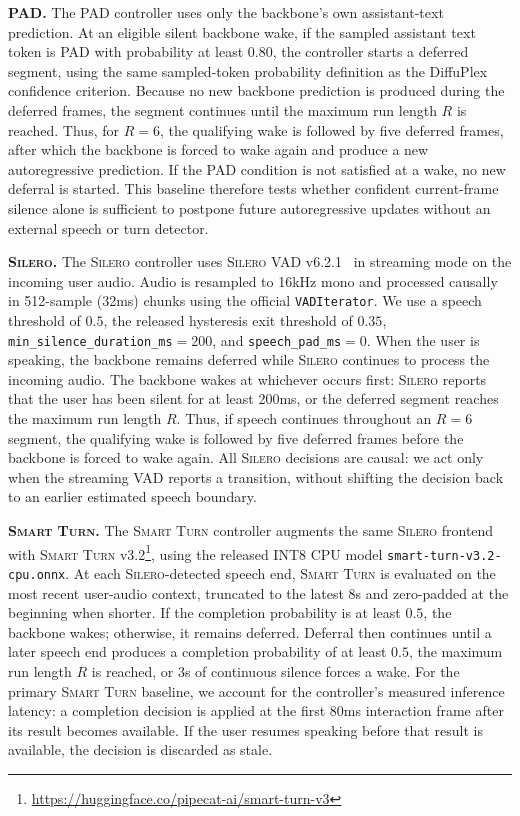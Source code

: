 \noindent\textbf{\textsc{PAD}.}
The \textsc{PAD} controller uses only the backbone's own assistant-text prediction.
At an eligible silent backbone wake, if the sampled assistant text token is PAD with probability at least $0.80$, the controller starts a deferred segment, using the same sampled-token probability definition as the DiffuPlex confidence criterion.
Because no new backbone prediction is produced during the deferred frames, the segment continues until the maximum run length $R$ is reached.
Thus, for $R=6$, the qualifying wake is followed by five deferred frames, after which the backbone is forced to wake again and produce a new autoregressive prediction.
If the PAD condition is not satisfied at a wake, no new deferral is started.
This baseline therefore tests whether confident current-frame silence alone is sufficient to postpone future autoregressive updates without an external speech or turn detector.

\noindent\textbf{\textsc{Silero}.}
The \textsc{Silero} controller uses \textsc{Silero VAD} v6.2.1~\citep{SileroVAD} in streaming mode on the incoming user audio.
Audio is resampled to 16kHz mono and processed causally in 512-sample (32ms) chunks using the official \texttt{VADIterator}.
We use a speech threshold of $0.5$, the released hysteresis exit threshold of $0.35$, \texttt{min\_silence\_duration\_ms}$=200$, and \texttt{speech\_pad\_ms}$=0$.
When the user is speaking, the backbone remains deferred while \textsc{Silero} continues to process the incoming audio.
The backbone wakes at whichever occurs first: \textsc{Silero} reports that the user has been silent for at least 200ms, or the deferred segment reaches the maximum run length $R$.
Thus, if speech continues throughout an $R=6$ segment, the qualifying wake is followed by five deferred frames before the backbone is forced to wake again.
All \textsc{Silero} decisions are causal: we act only when the streaming VAD reports a transition, without shifting the decision back to an earlier estimated speech boundary.

\noindent\textbf{\textsc{Smart Turn}.}
The \textsc{Smart Turn} controller augments the same \textsc{Silero} frontend with \textsc{Smart Turn} v3.2\footnote{\url{https://huggingface.co/pipecat-ai/smart-turn-v3}}, using the released INT8 CPU model \texttt{smart-turn-v3.2-cpu.onnx}.
At each \textsc{Silero}-detected speech end, \textsc{Smart Turn} is evaluated on the most recent user-audio context, truncated to the latest 8s and zero-padded at the beginning when shorter.
If the completion probability is at least $0.5$, the backbone wakes; otherwise, it remains deferred.
Deferral then continues until a later speech end produces a completion probability of at least $0.5$, the maximum run length $R$ is reached, or 3s of continuous silence forces a wake.
For the primary \textsc{Smart Turn} baseline, we account for the controller's measured inference latency: a completion decision is applied at the first 80ms interaction frame after its result becomes available.
If the user resumes speaking before that result is available, the decision is discarded as stale.

